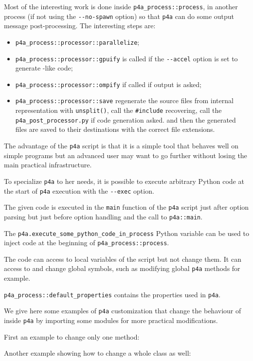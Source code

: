 \documentclass[a4paper]{article}
\begin{document}
Most of the interesting work is done inside \verb|p4a_process::process|,
in another process (if not using the \verb|--no-spawn| option) so that
\texttt{p4a} can do some \Apips output message post-processing. The
interesting steps are:
\begin{itemize}
\item \verb|p4a_process::processor::parallelize|;
\item \verb|p4a_process::processor::gpuify| is called if the
  \verb|--accel| option is set to generate \Agpu-like code;
\item \verb|p4a_process::processor::ompify| if called if \Aopenmp output
  is asked;
\item \verb|p4a_process::processor::save| regenerate the source files from
  \Apips internal representation with \verb|unsplit()|, call the
  \verb|#include| recovering, call the \verb|p4a_post_processor.py| if
  \Agpu code generation asked. and then the generated files are saved to
  their destinations with the correct file extensions.
\end{itemize}

The advantage of the \texttt{p4a} script is that it is a simple tool that
behaves well on simple programs but an advanced user may want to go
further without losing the main practical infrastructure.

To specialize \texttt{p4a} to her needs, it is possible to execute
arbitrary Python code at the start of \texttt{p4a} execution with the
\verb|--exec| option.

The given code is executed in the \verb|main| function of the \verb|p4a|
script just after option parsing but just before option handling and the
call to \verb|p4a::main|.

The \verb|p4a.execute_some_python_code_in_process| Python variable can be
used to inject code at the beginning of \verb|p4a_process::process|.

The code can access to local variables of the script but not change
them. It can access to and change global symbols, such as modifying global
\texttt{p4a} methods for example.

\verb|p4a_process::default_properties| contains the \Apips properties used
in \texttt{p4a}.

We give here some examples of \texttt{p4a} customization that change the
behaviour of \Apyps inside \texttt{p4a} by importing some modules for more
practical modifications.

First an example to change only one method:


Another example showing how to change a whole class as well:



\end{document}

